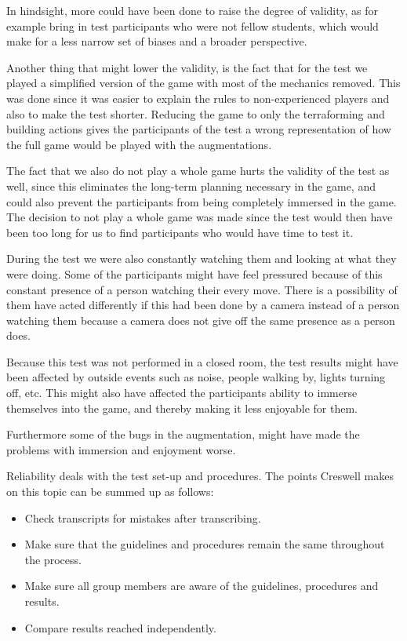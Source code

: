 In hindsight, more could have been done to raise the degree of validity, as for example bring in test participants who were not fellow students, which would make for a less narrow set of biases and a broader perspective.

Another thing that might lower the validity, is the fact that for the test we played a simplified version of the game with most of the mechanics removed. This was done since it was easier to explain the rules to non-experienced players and also to make the test shorter. Reducing the game to only the terraforming and building actions gives the participants of the test a wrong representation of how the full game would be played with the augmentations.

The fact that we also do not play a whole game hurts the validity of the test as well, since this eliminates the long-term planning necessary in the game, and could also prevent the participants from being completely immersed in the game. The decision to not play a whole game was made since the test would then have been too long for us to find participants who would have time to test it.

During the test we were also constantly watching them and looking at what they were doing. Some of the participants might have feel pressured because of this constant presence of a person watching their every move. There is a possibility of them have acted differently if this had been done by a camera instead of a person watching them because a camera does not give off the same presence as a person does.   

Because this test was not performed in a closed room, the test results might have been affected by outside events such as noise, people walking by, lights turning off, etc. This might also have affected the participants ability to immerse themselves into the game, and thereby making it less enjoyable for them. 

Furthermore some of the bugs in the augmentation, might have made the problems with immersion and enjoyment worse.



Reliability deals with the test set-up and procedures. The points Creswell \citep{Creswell} makes on this topic can be summed up as follows:

\begin{itemize}
\item Check transcripts for mistakes after transcribing.
\item Make sure that the guidelines and procedures remain the same throughout the process.
\item Make sure all group members are aware of the guidelines, procedures and results. 
\item Compare results reached independently.
\end{itemize}

